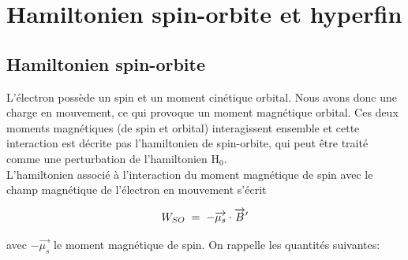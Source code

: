 \newpage
\section{Hamiltonien spin-orbite et hyperfin}
\subsection{Hamiltonien spin-orbite}





L'électron possède un spin et un moment cinétique orbital. Nous avons donc une charge en mouvement, ce qui provoque un moment magnétique orbital. Ces deux moments magnétiques (de spin et orbital) interagissent ensemble et cette interaction est décrite pas l'hamiltonien de spin-orbite, qui peut être traité comme une perturbation de l'hamiltonien H$_0$.\\
L'hamiltonien associé à l'interaction du moment magnétique de spin avec le champ magnétique de l’électron en mouvement s'écrit

\begin{equation*}
    W_{SO} \; = \;  -\overrightarrow{\mu_s}\cdot\overrightarrow{B}'
\end{equation*}

avec $-\overrightarrow{\mu_s}$ le moment magnétique de spin. On rappelle les quantités suivantes: 

